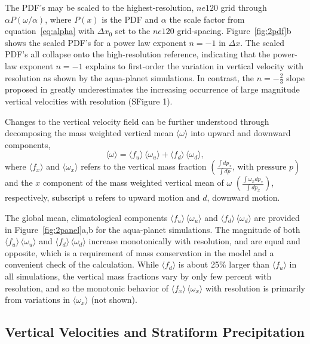 \documentclass[times]{qjrms4}
\begin{document}
The PDF's may be scaled to the highest-resolution, $ne120$ grid through $ \alpha P (\omega / \alpha)$, where $P(x)$ is the PDF and $\alpha$ the scale factor from equation~\ref{eq:alpha} with $\Delta x_0$ set to the $ne120$ grid-spacing. Figure~\ref{fig:2pdf}b shows the scaled PDF's for a power law exponent $n=-1$ in $\Delta x$. The scaled PDF's all collapse onto the high-resolution reference, indicating that the power-law exponent $n=-1$ explains to first-order the variation in vertical velocity with resolution as shown by the aqua-planet simulations. In contrast, the $n=-\frac{2}{3}$ slope proposed in \cite{RETAL2016CD} greatly underestimates the increasing occurrence of large magnitude vertical velocities with resolution (SFigure 1).

Changes to the vertical velocity field can be further understood through decomposing the mass weighted vertical mean $ \langle \omega \rangle$ into upward and downward components,
\begin{equation}
\langle \omega \rangle =\langle f_{u} \rangle \, \langle \omega_{u} \rangle + \langle f_{d} \rangle \, \langle \omega_{d} \rangle, \label{eq:omega}
\end{equation}
where $\langle f_x \rangle$ and $\langle \omega_x \rangle$ refers to the vertical mass fraction $ \left( \frac{\int dp_x}{\int dp} \textrm{, with pressure } p \right)$ and the $x$ component of the mass weighted vertical mean of $\omega$ $ \left( \frac{\int \omega_x dp_x}{\int dp_x} \right)$, respectively, subscript $u$ refers to upward motion and $d$, downward motion.

The global mean, climatological components $\langle f_{u} \rangle \, \langle \omega_{u} \rangle$ and $\langle f_{d} \rangle \, \langle \omega_{d} \rangle$ are provided in Figure~\ref{fig:2panel}a,b for the aqua-planet simulations. The magnitude of both $\langle f_{u} \rangle \, \langle \omega_{u} \rangle$ and $\langle f_{d} \rangle \, \langle \omega_{d} \rangle$ increase monotonically with resolution, and are equal and opposite, which is a requirement of mass conservation in the model and a convenient check of the calculation. While $\langle f_{d} \rangle$ is about 25\% larger than $\langle f_{u} \rangle$ in all simulations, the vertical mass fractions vary by only few percent with resolution, and so the monotonic behavior of $\langle f_{x} \rangle \, \langle \omega_{x} \rangle$ with resolution is primarily from variations in $ \langle \omega_{x} \rangle$ (not shown).

\subsection{Vertical Velocities and Stratiform Precipitation}
\end{document}
